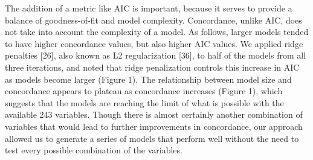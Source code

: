 \documentclass[12pt,oneside]{reedthesis}
\theoremstyle{definition}
\theoremstyle{definition}
\theoremstyle{definition}
\theoremstyle{remark}
\begin{document}
The addition of a metric like AIC is important, because it serves to
provide a balance of goodness-of-fit and model complexity. Concordance,
unlike AIC, does not take into account the complexity of a model. As
follows, larger models tended to have higher concordance values, but
also higher AIC values. We applied ridge penalties {[}26{]}, also known
as L2 regularization {[}36{]}, to half of the models from all three
iterations, and noted that ridge penalization controls this increase in
AIC as models become larger (Figure 1). The relationship between model
size and concordance appears to plateau as concordance increases (Figure
1), which suggests that the models are reaching the limit of what is
possible with the available 243 variables. Though there is almost
certainly another combination of variables that would lead to further
improvements in concordance, our approach allowed us to generate a
series of models that perform well without the need to test every
possible combination of the variables.
\end{document}
